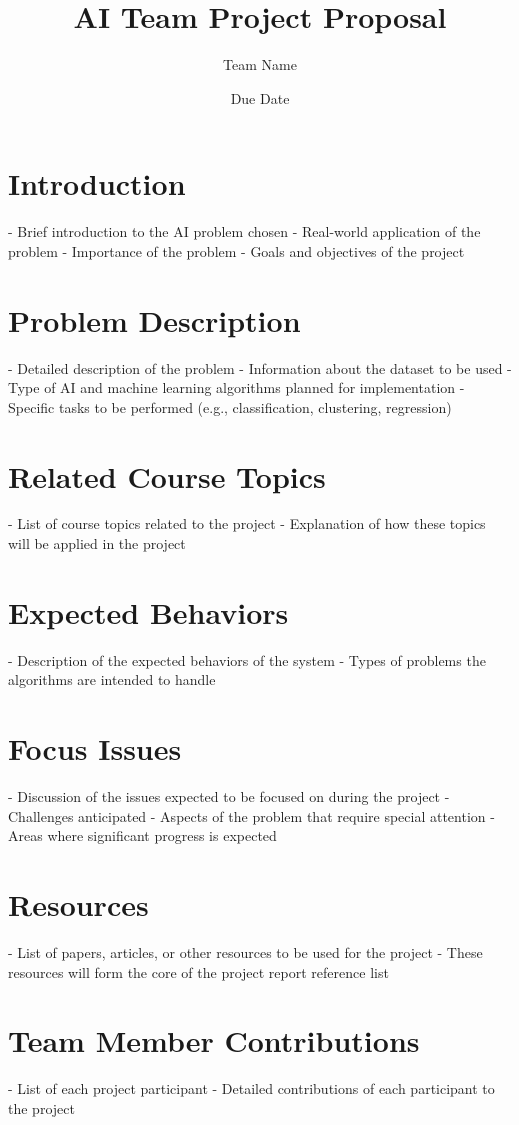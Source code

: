 \documentclass{article}
\title{AI Team Project Proposal}
\author{Team Name}
\date{Due Date}
\begin{document}


\maketitle

\section{Introduction}

- Brief introduction to the AI problem chosen
- Real-world application of the problem
- Importance of the problem
- Goals and objectives of the project

\section{Problem Description}

- Detailed description of the problem
- Information about the dataset to be used
- Type of AI and machine learning algorithms planned for implementation
- Specific tasks to be performed (e.g., classification, clustering, regression)

\section{Related Course Topics}

- List of course topics related to the project
- Explanation of how these topics will be applied in the project

\section{Expected Behaviors}

- Description of the expected behaviors of the system
- Types of problems the algorithms are intended to handle

\section{Focus Issues}

- Discussion of the issues expected to be focused on during the project
- Challenges anticipated
- Aspects of the problem that require special attention
- Areas where significant progress is expected

\section{Resources}

- List of papers, articles, or other resources to be used for the project
- These resources will form the core of the project report reference list

\section{Team Member Contributions}

- List of each project participant
- Detailed contributions of each participant to the project
\end{document}
